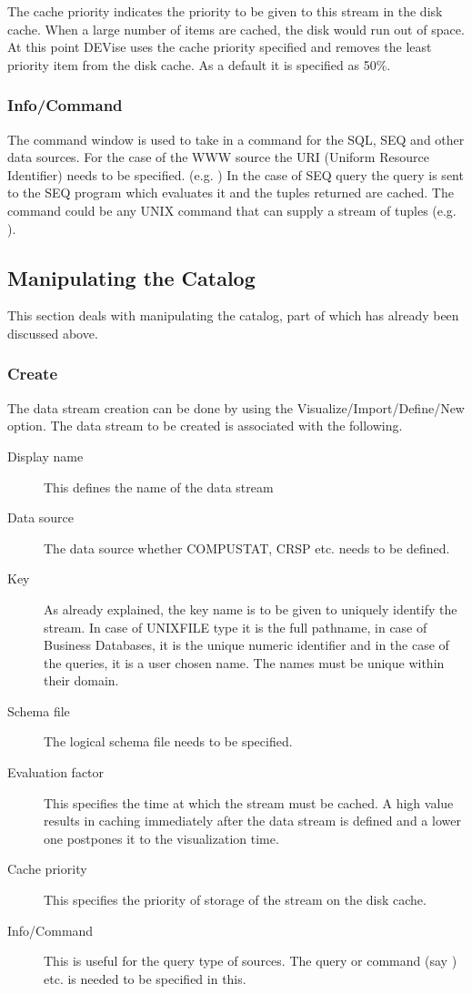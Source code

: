 The cache priority indicates the priority to be given to this stream
in the disk cache. When a large number of items are cached, the disk
would run out of space. At this point DEVise uses the cache priority
specified and removes the least priority item from the disk cache. As
a default it is specified as 50\%.

\subsubsection{Info/Command}

The command window is used to take in a command for the SQL, SEQ and
other data sources. For the case of the WWW source the URI (Uniform
Resource Identifier) needs to be specified. (e.g. ) In
the case of SEQ query the query is sent to the SEQ program which
evaluates it and the tuples returned are cached. The command could be
any UNIX command that can supply a stream of tuples
(e.g. ).

\subsection{Manipulating the Catalog}

This section deals with manipulating the catalog, part of which has
already been discussed above.

\subsubsection{Create}

The data stream creation can be done by using the
Visualize/Import/Define/New option.  The data stream to be created is
associated with the following.

\begin{description}
\item[Display name] This defines the name of the data stream
\item[Data source] The data source whether COMPUSTAT, CRSP etc. needs
to be defined.
\item[Key] As already explained, the key name is to be given to
uniquely identify the stream. In case of UNIXFILE type it is the full
pathname, in case of Business Databases, it is the unique numeric
identifier and in the case of the queries, it is a user chosen
name. The names must be unique within their domain.
\item[Schema file] The logical schema file needs to be specified.
\item[Evaluation factor] This specifies the time at which the stream
must be cached. A high value results in caching immediately after the
data stream is defined and a lower one postpones it to the
visualization time.
\item[Cache priority] This specifies the priority of storage of the
stream on the disk cache.
\item[Info/Command] This is useful for the query type of sources. The
query or command (say ) etc. is needed to be
specified in this.
\end{description}


